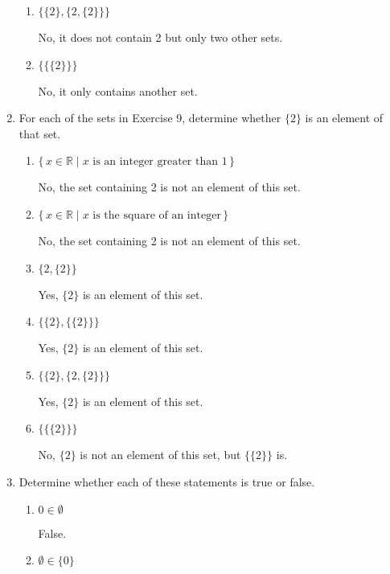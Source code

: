 \documentclass[11pt]{article}
\begin{document}
\begin{enumerate}[label=\textbf{\arabic*.}]
\begin{enumerate}[label=\textbf{\alph*)}]
		\item $\{\{2\}, \{2, \{2\}\}\}$
		
		No, it does not contain 2 but only two other sets.
		
		\item $\{\{\{2\}\}\}$
		
		No, it only contains another set.
	\end{enumerate}

	\item For each of the sets in Exercise 9, determine whether $\{2\}$ is an element of that set.
	
		\begin{enumerate}[label=\textbf{\alph*)}]
		\item $\{\,x \in \mathbb{R} \mid x \text{ is an integer greater than } 1\,\}$
		
		No, the set containing 2 is not an element of this set.
		
		\item $\{\,x \in \mathbb{R} \mid x \text{ is the square of an integer}\,\}$
		
		No, the set containing 2 is not an element of this set.		
		
		\item $\{2, \{2\}\}$
		
		Yes, $\{2\}$ is an element of this set.
		
		\item $\{\{2\}, \{\{2\}\}\}$
		
		Yes, $\{2\}$ is an element of this set.
		
		\item $\{\{2\}, \{2, \{2\}\}\}$
		
		Yes, $\{2\}$ is an element of this set.
		
		\item $\{\{\{2\}\}\}$
		
		No, $\{2\}$ is not an element of this set, but $\{\{2\}\}$ is.
	\end{enumerate}

	\item Determine whether each of these statements is true or false.
	
	\begin{enumerate}[label=\textbf{\alph*)}]
		\item $0 \in \emptyset$
		
		False.
		
		\item $\emptyset \in \{0\}$
		

\end{enumerate}
\end{enumerate}
\end{document}
